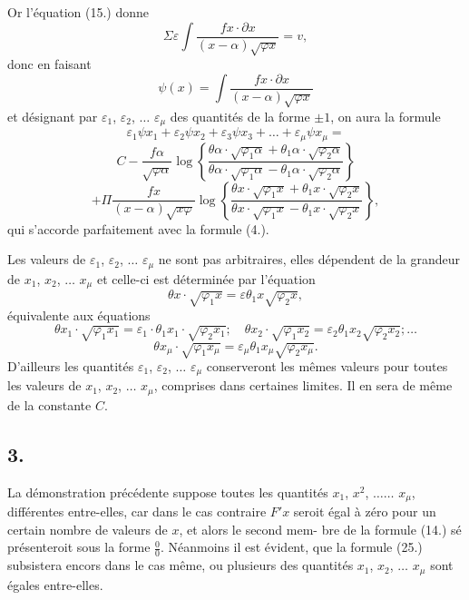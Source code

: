 \documentclass{article}
\begin{document}
Or l'équation (15.) donne
\[ \Sigma\varepsilon\int \frac{fx \cdot \partial x}{(x-\alpha)\sqrt{\varphi x}} = v, \]
donc en faisant
\[ \psi(x) = \int \frac{fx \cdot \partial x}{(x-\alpha)\sqrt{\varphi x}} \tag{24} \]
et désignant par $\varepsilon_1$, $\varepsilon_2$, $\ldots$ $\varepsilon_\mu$ des quantités de la forme $\pm 1$, on aura la formule
\[ \varepsilon_1\psi x_1 + \varepsilon_2\psi x_2 + \varepsilon_3\psi x_3 + \ldots + \varepsilon_\mu\psi x_\mu = \tag{25} \]
\[ C - \frac{f\alpha}{\sqrt{\varphi\alpha}}\log\left\{\frac{\theta\alpha \cdot \sqrt{\varphi_1\alpha}+\theta_1\alpha \cdot \sqrt{\varphi_2\alpha}}{\theta\alpha \cdot \sqrt{\varphi_1\alpha}-\theta_1\alpha \cdot \sqrt{\varphi_2\alpha}}\right\} \]
\[ + \Pi\frac{fx}{(x-\alpha)\sqrt{x\varphi}}\log\left\{\frac{\theta x \cdot \sqrt{\varphi_1 x}+\theta_1 x \cdot \sqrt{\varphi_2 x}}{\theta x \cdot \sqrt{\varphi_1 x}-\theta_1 x \cdot \sqrt{\varphi_2 x}}\right\}, \]
qui s'accorde parfaitement avec la formule (4.).

Les valeurs de $\varepsilon_1$, $\varepsilon_2$, $\ldots$ $\varepsilon_\mu$ ne sont pas arbitraires, elles dépendent de la grandeur de $x_1$, $x_2$, $\ldots$ $x_\mu$ et celle-ci est déterminée par l'équation
\[ \theta x \cdot \sqrt{\varphi_1 x} = \varepsilon\theta_1 x\sqrt{\varphi_2 x}, \]
équivalente aux équations
\[ \theta x_1 \cdot \sqrt{\varphi_1 x_1} = \varepsilon_1 \cdot \theta_1 x_1 \cdot \sqrt{\varphi_2 x_1}; \quad \theta x_2 \cdot \sqrt{\varphi_1 x_2} = \varepsilon_2\theta_1 x_2\sqrt{\varphi_2 x_2}; \ldots \tag{26} \]
\[ \theta x_\mu \cdot \sqrt{\varphi_1 x_\mu} = \varepsilon_\mu\theta_1 x_\mu\sqrt{\varphi_2 x_\mu}. \]
D'ailleurs les quantités $\varepsilon_1$, $\varepsilon_2$, $\ldots$ $\varepsilon_\mu$ conserveront les mêmes valeurs pour toutes les valeurs de $x_1$, $x_2$, $\ldots$ $x_\mu$, comprises dans certaines limites. Il en sera de même de la constante $C$.

\subsection*{3.}

La démonstration précédente suppose toutes les quantités $x_1$, $x^{2}$, $\ldots\ldots$ $x_\mu$, différentes entre-elles, car dans le cas contraire $F'x$ seroit égal à zéro pour un certain nombre de valeurs de $x$, et alors le second mem-
bre de la formule (14.) sé présenteroit sous la forme $\frac{0}{0}$. Néanmoins il est évident, que la formule (25.) subsistera encors dans le cas même, ou plusieurs des quantités $x_1$, $x_2$, $\ldots$ $x_\mu$ sont égales entre-elles.
\end{document}
